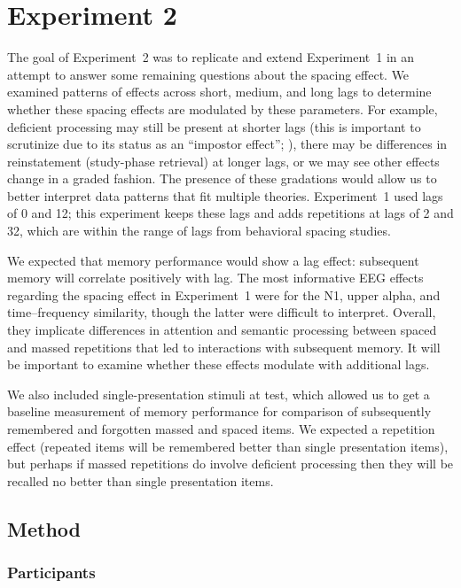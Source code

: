 
\chapter{Experiment 2}

The goal of Experiment~2 was to replicate and extend Experiment~1 in an attempt to answer some remaining questions about the spacing effect.  We examined patterns of effects across short, medium, and long lags to determine whether these spacing effects are modulated by these parameters.  For example, deficient processing may still be present at shorter lags (this is important to scrutinize due to its status as an ``impostor effect''; ), there may be differences in reinstatement (study-phase retrieval) at longer lags, or we may see other effects change in a graded fashion.
The presence of these gradations would allow us to better interpret data patterns that fit multiple theories.  Experiment~1 used lags of 0 and 12; this experiment keeps these lags and adds repetitions at lags of 2 and 32, which are within the range of lags from behavioral spacing studies.

We expected that memory performance would show a lag effect: subsequent memory will correlate positively with lag.  The most informative EEG effects regarding the spacing effect in Experiment~1 were for the N1, upper alpha, and time--frequency similarity, though the latter were difficult to interpret.  Overall, they implicate differences in attention and semantic processing between spaced and massed repetitions that led to interactions with subsequent memory.  It will be important to examine whether these effects modulate with additional lags.

We also included single-presentation stimuli at test, which allowed us to get a baseline measurement of memory performance for comparison of subsequently remembered and forgotten massed and spaced items.  We expected a repetition effect (repeated items will be remembered better than single presentation items), but perhaps if massed repetitions do involve deficient processing then they will be recalled no better than single presentation items.

\section{Method}

\subsection{Participants}

